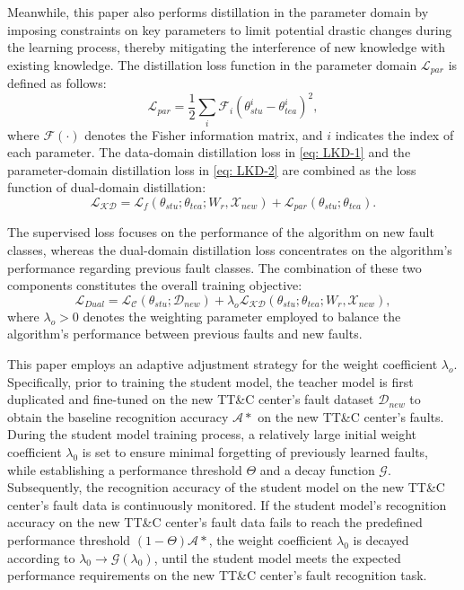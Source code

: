 Meanwhile, this paper also performs distillation in the parameter domain by imposing constraints on key parameters 
to limit potential drastic changes during the learning process, 
thereby mitigating the interference of new knowledge with existing knowledge. 
The distillation loss function in the parameter domain ${\mathcal L_{par}}$ is defined as follows:
\begin{equation}
	{\mathcal L_{par}} = \frac{1}{2}\sum\limits_i {{\mathcal F_i}{{\left( {\theta _{stu}^i - \theta _{tea}^i} \right)}^2}},
	\label{eq: LKD-2}
\end{equation}
where $\mathcal F\left( \cdot \right)$ denotes the Fisher information matrix, and $i$ indicates the index of each parameter. 
The data-domain distillation loss in \eqref{eq: LKD-1} and the parameter-domain distillation loss in \eqref{eq: LKD-2} 
are combined as the loss function of dual-domain distillation:
\begin{equation}
	{\mathcal {L_{KD}}} = {\mathcal L_{f}}\left( {{\theta _{stu}};{\theta _{tea}};{W_r},{\mathcal X_{new}}} \right) + {\mathcal L_{par}}\left( {{\theta _{stu}};{\theta _{tea}}} \right).
\end{equation}

The supervised loss focuses on the performance of the algorithm on new fault classes, 
whereas the dual-domain distillation loss concentrates on the algorithm's performance regarding previous fault classes. 
The combination of these two components constitutes the overall training objective:
\begin{equation}
	{\mathcal L_{Dual}} = {\mathcal {L_C}}\left( {{\theta _{stu}};{{\mathscr D}_{new}}} \right) + {\lambda _o}{\mathcal {L_{KD}}}\left( {{\theta _{stu}};{\theta _{tea}};{W_r},{\mathcal X_{new}}} \right),
\end{equation}
where ${\lambda _o} > 0$ denotes the weighting parameter employed to balance the algorithm's performance between previous faults and new faults.

This paper employs an adaptive adjustment strategy for the weight coefficient ${\lambda _o}$.
Specifically, prior to training the student model, 
the teacher model is first duplicated and fine-tuned on the new TT\&C center's fault dataset ${\mathscr D}_{new}$ 
to obtain the baseline recognition accuracy $\mathcal{A}*$ on the new TT\&C center's faults. 
During the student model training process, a relatively large initial weight coefficient $\lambda_0$ 
is set to ensure minimal forgetting of previously learned faults, 
while establishing a performance threshold $\varTheta$ and a decay function $\mathcal{G}$. 
Subsequently, the recognition accuracy of the student model on the new TT\&C center's fault data is continuously monitored. 
If the student model's recognition accuracy on the new TT\&C center's fault data 
fails to reach the predefined performance threshold $(1-\varTheta)\mathcal{A}*$, 
the weight coefficient $\lambda_0$ is decayed according to $\lambda_0\rightarrow \mathcal{G}(\lambda_0)$, 
until the student model meets the expected performance requirements 
on the new TT\&C center's fault recognition task.

